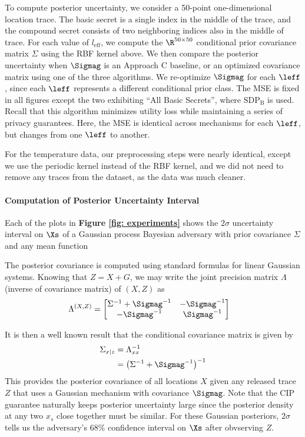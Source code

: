 To compute posterior uncertainty, we consider a 50-point one-dimensional location trace. The basic secret is a single index in the middle of the trace, and the compound secret consists of two neighboring indices also in the middle of trace. For each value of $l_{\text{eff}}$, we compute the $\R^{50 \times 50}$ conditional prior covariance matrix $\Sigma$ using the RBF kernel above. We then compare the posterior uncertainty when $\Sigmag$ is an Approach C baseline, or an optimized covariance matrix using one of the three algorithms. We re-optimize $\Sigmag$ for each $\leff$, since each $\leff$ represents a different conditional prior class. The MSE is fixed in all figures except the two exhibiting ``All Basic Secrets'', where $\text{SDP}_\text{B}$ is used. Recall that this algorithm minimizes utility loss while maintaining a series of privacy guarantees. Here, the MSE is identical across mechanisms for each $\leff$, but changes from one $\leff$ to another. 

For the temperature data, our preprocessing steps were nearly identical, except we use the periodic kernel instead of the RBF kernel, and we did not need to remove any traces from the dataset, as the data was much cleaner. 

\paragraph{Computation of Posterior Uncertainty Interval}
Each of the plots in \textbf{Figure \ref{fig: experiments}} shows the $2\sigma$ uncertainty interval on $\Xs$ of a Gaussian process Bayesian adversary with prior covariance $\Sigma$ and any mean function

The posterior covariance is computed using standard formulas for linear Gaussian systems. Knowing that $Z = X + G$, we may write the joint precision matrix $\Lambda$ (inverse of covariance matrix) of $(X,Z)$ as 
\begin{align*}
	\Lambda^{(X,Z)}
	&= 
	\begin{bmatrix}
		\Sigma^{-1} + {\Sigmag}^{-1} & -{\Sigmag}^{-1} \\
		-{\Sigmag}^{-1} & {\Sigmag}^{-1} 
	\end{bmatrix}
\end{align*}

It is then a well known result that the conditional covariance matrix is given by 
\begin{align*}
	\Sigma_{x|z} &= \Lambda_{xx}^{-1}  \\
	&= \big(\Sigma^{-1} + {\Sigmag}^{-1}\big)^{-1}
\end{align*}
This provides the posterior covariance of all locations $X$ given any released trace $Z$ that uses a Gaussian mechanism with covariance $\Sigmag$. Note that the CIP guarantee naturally keeps posterior uncertainty large since the posterior density at any two $x_s$ close together must be similar. For these Gaussian posteriors, $2 \sigma$ tells us the adversary's 68\% confidence interval on $\Xs$ after obvserving $Z$. 

